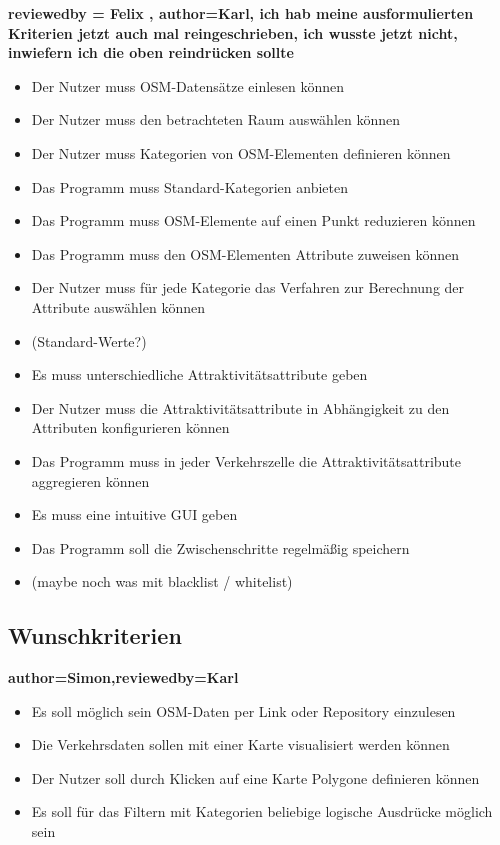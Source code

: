 \documentclass[parskip=full]{scrartcl} %
\begin{document}
\textbf{reviewedby = Felix , author=Karl, ich hab meine ausformulierten Kriterien jetzt auch mal reingeschrieben, ich wusste jetzt nicht, inwiefern ich die oben reindrücken sollte\\}
\begin{itemize}
    \item Der Nutzer muss OSM-Datensätze einlesen können
    \item Der Nutzer muss den betrachteten Raum auswählen können
    \item Der Nutzer muss Kategorien von OSM-Elementen definieren können
    \item Das Programm muss Standard-Kategorien anbieten
    \item Das Programm muss OSM-Elemente auf einen Punkt reduzieren können
    \item Das Programm muss den OSM-Elementen Attribute zuweisen können
    \item Der Nutzer muss für jede Kategorie das Verfahren zur Berechnung der Attribute auswählen können
    \item (Standard-Werte?)
    \item Es muss unterschiedliche Attraktivitätsattribute geben
    \item Der Nutzer muss die Attraktivitätsattribute in Abhängigkeit zu den Attributen konfigurieren können
    \item Das Programm muss in jeder Verkehrszelle die Attraktivitätsattribute aggregieren können
    \item Es muss eine intuitive GUI geben
    \item Das Programm soll die Zwischenschritte regelmäßig speichern
    \item (maybe noch was mit blacklist / whitelist)
\end{itemize}


\subsection{Wunschkriterien}
\textbf{author=Simon,reviewedby=Karl\\}
\begin{itemize}
    \item Es soll möglich sein OSM-Daten per Link oder Repository einzulesen
    \item Die Verkehrsdaten sollen mit einer Karte visualisiert werden können
    \item Der Nutzer soll durch Klicken auf eine Karte Polygone definieren können
    \item Es soll für das Filtern mit Kategorien beliebige logische Ausdrücke möglich sein
\end{itemize}
\end{document}
